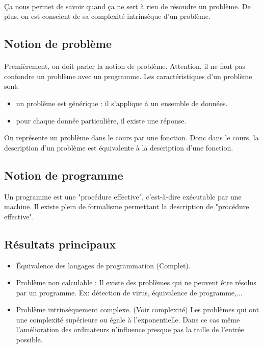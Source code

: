 \documentclass[11pt,a4paper]{article}
\theoremstyle{definition}
\begin{document}
\paragraph{}
Ça nous permet de savoir quand ça ne sert à rien de résoudre un problème.
De plus, on est conscient de sa complexité intrinsèque d'un
problème.

\subsection{Notion de problème}
\label{subsec:notion_de_probl_me}

\paragraph{}
Premièrement, on doit parler la notion de problème.
Attention, il ne faut pas confondre un problème avec un programme.
Les caractéristiques d'un problème sont:

\begin{itemize}
	\item un problème est générique : il s'applique à un ensemble de données.
	\item pour chaque donnée particulière, il existe une réponse.
\end{itemize}
On représente un problème dans le cours par une fonction. Donc dans le cours,
la description d'un problème est équivalente à la description d'une fonction.

\subsection{Notion de programme}
\label{ssub:notion_de_programme}

Un programme est une "procédure effective", c'est-à-dire exécutable par une machine.
Il existe plein de formalisme permettant la description de "procédure effective".


\subsection{Résultats principaux}
\label{sub:r_sultat_principaux}

\begin{itemize}
	\item Équivalence des langages de programmation (Complet).
	\item Problème non calculable : Il existe des problèmes qui ne peuvent 
		être résolus par un programme. Ex: détection de virus, équivalence
		de programme,...
	\item Problème intrinsèquement complexe. (Voir complexité) Les problèmes
		qui ont une complexité supérieure ou égale à l'exponentielle. Dans
		ce cas même l'amélioration des ordinateurs n'influence presque pas
		la taille de l'entrée possible.
\end{itemize}
\end{document}
